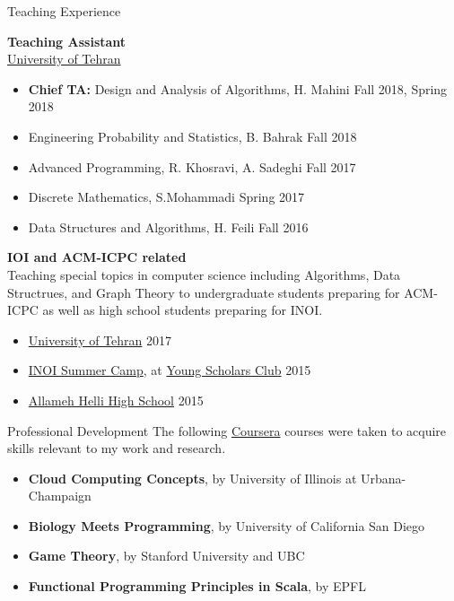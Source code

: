 \documentclass{resume} %
\begin{document}
\begin{rSection}{Teaching Experience}
	
	{\bf Teaching Assistant}
	\\\href{http://ut.ac.ir/en}{University of Tehran}
	\begin{itemize}
		\item {\bf Chief TA:} Design and Analysis of Algorithms, H. Mahini \hfill Fall 2018, Spring 2018
		\item Engineering Probability and Statistics, B. Bahrak \hfill Fall 2018
		\item Advanced Programming, R. Khosravi, A. Sadeghi \hfill Fall 2017
		\item Discrete Mathematics, S.Mohammadi \hfill Spring 2017
		\item Data Structures and Algorithms, H. Feili \hfill Fall 2016
	\end{itemize}
	
	{\bf IOI and ACM-ICPC related}
	\\Teaching special topics in computer science including Algorithms, Data Structrues,
	and Graph Theory to undergraduate students preparing for ACM-ICPC as well as high school
	students preparing for INOI.
	\begin{itemize}
		\item \href{http://ut.ac.ir/en}{University of Tehran} \hfill 2017
		\item \href{http://inoi.ir/}{INOI Summer Camp}, at \href{http://ysc.ac.ir/}{Young Scholars Club} \hfill 2015
		\item \href{http://www.helli.ir/}{Allameh Helli High School} \hfill 2015
	\end{itemize}
	
\end{rSection}


\begin{rSection}{Professional Development}
	The following \href{https://www.coursera.org/}{Coursera} courses were taken to acquire skills relevant to my work and research.
	\begin{itemize}
		\item {\bf Cloud Computing Concepts}, by University of Illinois at Urbana-Champaign
		\item {\bf Biology Meets Programming}, by University of California San Diego
		\item {\bf Game Theory}, by Stanford University and UBC
		\item {\bf Functional Programming Principles in Scala}, by EPFL
	\end{itemize}
\end{rSection}
\end{document}
